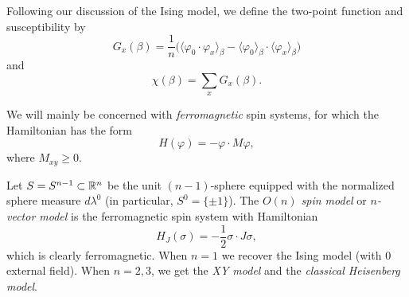 Following our discussion of the Ising model, we define the two-point function
and susceptibility by
\begin{equation}
G_x(\beta)
  =
\frac{1}{n}
\big(\langle \varphi_0 \cdot \varphi_x \rangle_\beta
  -
\langle \varphi_0 \rangle_\beta \cdot \langle \varphi_x \rangle_\beta\big)
\end{equation}
and
\begin{equation}
\chi(\beta) = \sum_x G_x(\beta).
\end{equation}

We will mainly be concerned with \emph{ferromagnetic} spin systems, for which the
Hamiltonian has the form
\begin{equation}
H(\varphi) = -\varphi \cdot M\varphi,
\end{equation}
where $M_{xy} \ge 0$.



\begin{example}
Let $S = S^{n-1} \subset {\mathbb R}^n$ be the unit $(n-1)$-sphere equipped with the
normalized sphere measure $d\lambda^0$ (in particular, $S^0 = \{ \pm 1 \}$).
The \emph{$O(n)$ spin model} or \emph{$n$-vector model} is the ferromagnetic
spin system with Hamiltonian
\begin{equation}
H_J(\sigma) = -\frac{1}{2} \sigma \cdot J \sigma,
\end{equation}
which is clearly ferromagnetic. When $n = 1$ we recover the Ising model (with
$0$ external field). When $n = 2, 3$, we get the \emph{XY model} and the
\emph{classical Heisenberg model}.
\end{example}



